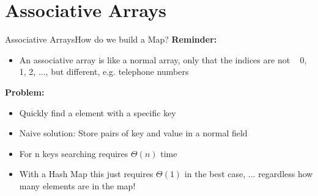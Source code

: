 

\section{Associative Arrays}


\begin{frame}{Associative Arrays}{How do we build a Map?}
  \textbf{Reminder:}
  \begin{itemize}
  \item An associative array is like a normal array, only that
    the indices are not {\color{Mittel-Blau}~ 0, 1, 2, ...}, but
    different, e.g. telephone numbers
  \end{itemize}
  \textbf{Problem:}
  \begin{itemize}
  \item Quickly find a element with a specific key
  \item Naive solution: Store pairs of key and value
    in a normal field
  \item For {\color{Mittel-Blau} n } keys searching requires {\color{Mittel-Blau} $\Theta(n)$} time
  \item With a {\color{Mittel-Blau} Hash Map } this just requires {\color{Mittel-Blau} $\Theta(1)$}
    in the best case, ... regardless how many elements are in the map!
  \end{itemize}
\end{frame}


